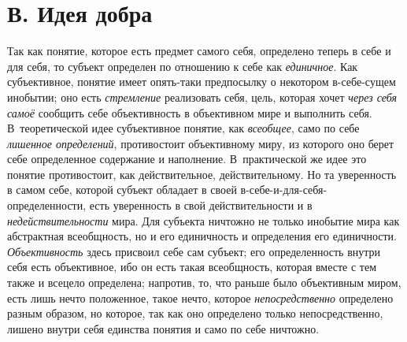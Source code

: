 {{\section[В. Идея добра]{В. Идея добра}
Так как понятие, которое есть предмет самого себя, определено
теперь в себе и для себя, то субъект определен по отношению к себе как
{\em единичное}. Как
субъективное, понятие имеет опять-таки предпосылку о некотором в-себе-сущем
инобытии; оно есть {\em стремление}
реализовать себя, цель, которая хочет
{\em через себя самоё}
сообщить себе объективность в объективном мире и выполнить
себя. В~теоретической идее субъективное понятие, как
{\em всеобщее}, само по
себе {\em лишенное определений},
противостоит объективному миру, из которого оно берет себе
определенное содержание и наполнение. В~практической же идее это понятие
противостоит, как действительное, действительному. Но та уверенность в
самом себе, которой субъект обладает в своей
в-себе-и-для-себя-определенности, есть уверенность в свой действительности
и в {\em недействительности}
мира. Для субъекта ничтожно не только инобытие мира как
абстрактная всеобщность, но и его единичность и определения его
единичности. {\em Объективность}
здесь присвоил себе сам субъект; его определенность внутри
себя есть объективное, ибо он есть такая всеобщность, которая вместе с тем
также и всецело определена; напротив, то, что раньше было объективным
миром, есть лишь нечто положенное, такое нечто, которое
{\em непосредственно}
определено разным образом, но которое, так как оно определено
только непосредственно, лишено внутри себя единства понятия и само по себе
ничтожно.

}}
